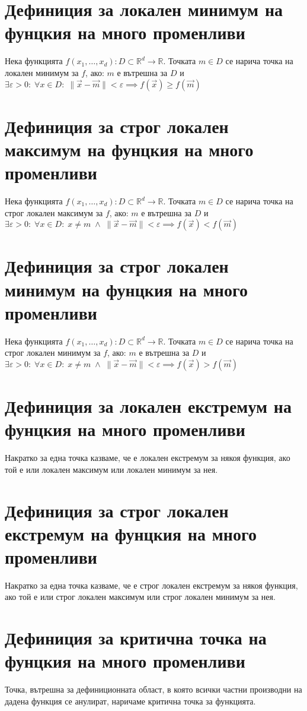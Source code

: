 \documentclass[14pt]{extarticle}
\newcommand{\R}{\mathbb{R}}
\newcommand{\Vector}[1]{\overrightarrow{#1}}
\begin{document}
\section*{Дефиниция за локален минимум на фунцкия на много променливи}
Нека функцията \(f(x_1, \dots, x_d) : D \subset \R^d \to \R\). Точката \(m \in D\) се нарича точка на локален минимум за \(f\), ако: \(m\) е вътрешна за \(D\) и \\
\(\exists \varepsilon > 0 : \; \forall x \in D : \; \|\Vector{x} - \Vector{m}\| < \varepsilon \implies f(\Vector{x}) \geq f(\Vector{m})\)
\section*{Дефиниция за строг локален максимум на фунцкия на много променливи}
Нека функцията \(f(x_1, \dots, x_d) : D \subset \R^d \to \R\). Точката \(m \in D\) се нарича точка на строг локален максимум за \(f\), ако: \(m\) е вътрешна за \(D\) и \\
\(\exists \varepsilon > 0 : \; \forall x \in D : \; x \neq m \; \land \; \|\Vector{x} - \Vector{m}\| < \varepsilon \implies f(\Vector{x}) < f(\Vector{m})\)
\section*{Дефиниция за строг локален минимум на фунцкия на много променливи}
Нека функцията \(f(x_1, \dots, x_d) : D \subset \R^d \to \R\). Точката \(m \in D\) се нарича точка на строг локален минимум за \(f\), ако: \(m\) е вътрешна за \(D\) и \\
\(\exists \varepsilon > 0 : \; \forall x \in D : \; x \neq m \; \land \; \|\Vector{x} - \Vector{m}\| < \varepsilon \implies f(\Vector{x}) > f(\Vector{m})\)
\section*{Дефиниция за локален екстремум на фунцкия на много променливи}
Накратко за една точка казваме, че е локален екстремум за някоя функция, ако той е или локален максимум или локален минимум за нея.
\section*{Дефиниция за строг локален екстремум на фунцкия на много променливи}
Накратко за една точка казваме, че е строг локален екстремум за някоя функция, ако той е или строг локален максимум или строг локален минимум за нея.
\section*{Дефиниция за критична точка на фунцкия на много променливи}
Точка, вътрешна за дефиниционната област, в която всички частни производни на дадена функция се анулират, наричаме критична точка за функцията.
\end{document}
